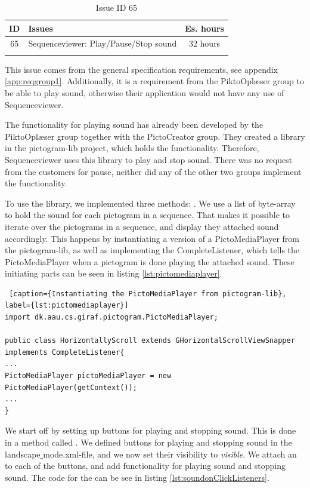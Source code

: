 \begin{longtable} { | c | p{12cm} | c | } 
\hline
	ID 	&	Issues	&		 Es. hours \\\hline
	 65	&	Sequenceviewer: Play/Pause/Stop sound	&	32 hours \\\hline
\caption{Issue ID 65}
\label{tab:spr4_SVplaypausestopsound}
\end{longtable}

This issue comes from the general specification requirements, see appendix \ref{app:reqgroup1}. Additionally, it is a requirement from the PiktoOplæser group to be able to play sound, otherwise their application would not have any use of Sequenceviewer.

The functionality for playing sound has already been developed by the PiktoOplæser group together with the PictoCreator group. They created a library in the pictogram-lib project, which holds the functionality. Therefore, Sequenceviewer uses this library to play and stop sound. There was no request from the customers for pause, neither did any of the other two groups implement the functionality.

To use the library, we implemented three methods: . We use a list of byte-array to hold the sound for each pictogram in a sequence. That makes it possible to iterate over the pictograms in a sequence, and display they attached sound accordingly. This happens by instantiating a version of a PictoMediaPlayer from the pictogram-lib, as well as implementing the CompleteListener, which tells the PictoMediaPlayer when a pictogram is done playing the attached sound. These initiating parts can be seen in listing \ref{lst:pictomediaplayer}.

\begin{lstlisting} [caption={Instantiating the PictoMediaPlayer from pictogram-lib}, label={lst:pictomediaplayer}]
import dk.aau.cs.giraf.pictogram.PictoMediaPlayer;

public class HorizontallyScroll extends GHorizontalScrollViewSnapper implements CompleteListener{
...
PictoMediaPlayer pictoMediaPlayer = new PictoMediaPlayer(getContext());
...
}
\end{lstlisting}

We start off by setting up buttons for playing and stopping sound. This is done in a method called . We defined buttons for playing and stopping sound in the landscape$\_$mode.xml-file, and we now set their visibility to \textit{visible}. We attach an  to each of the buttons, and add functionality for playing sound and stopping sound. The code for the  can be see in listing \ref{lst:soundonClickListeners}.

